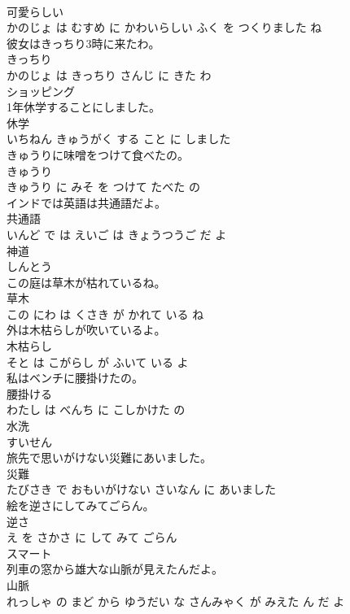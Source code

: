 \documentclass[8pt]{extreport}
\begin{document}
\begin{CJK}{UTF8}{min}
\\	可愛らしい 
\\	かのじょ は むすめ に かわいらしい ふく を つくりました ね			
\\	彼女はきっちり3時に来たわ。	
\\	きっちり 
\\	かのじょ は きっちり さんじ に きた わ			
\\	ショッピング	
\\	1年休学することにしました。	
\\	休学 
\\	いちねん きゅうがく する こと に しました			
\\	きゅうりに味噌をつけて食べたの。	
\\	きゅうり 
\\	きゅうり に みそ を つけて たべた の			
\\	インドでは英語は共通語だよ。	
\\	共通語 
\\	いんど で は えいご は きょうつうご だ よ			
\\	神道	
\\	しんとう			
\\	この庭は草木が枯れているね。	
\\	草木 
\\	この にわ は くさき が かれて いる ね			
\\	外は木枯らしが吹いているよ。	
\\	木枯らし 
\\	そと は こがらし が ふいて いる よ			
\\	私はベンチに腰掛けたの。	
\\	腰掛ける 
\\	わたし は べんち に こしかけた の			
\\	水洗	
\\	すいせん			
\\	旅先で思いがけない災難にあいました。	
\\	災難 
\\	たびさき で おもいがけない さいなん に あいました			
\\	絵を逆さにしてみてごらん。	
\\	逆さ 
\\	え を さかさ に して みて ごらん			
\\	スマート	
\\	列車の窓から雄大な山脈が見えたんだよ。	
\\	山脈 
\\	れっしゃ の まど から ゆうだい な さんみゃく が みえた ん だ よ			

\end{CJK}
\end{document}
